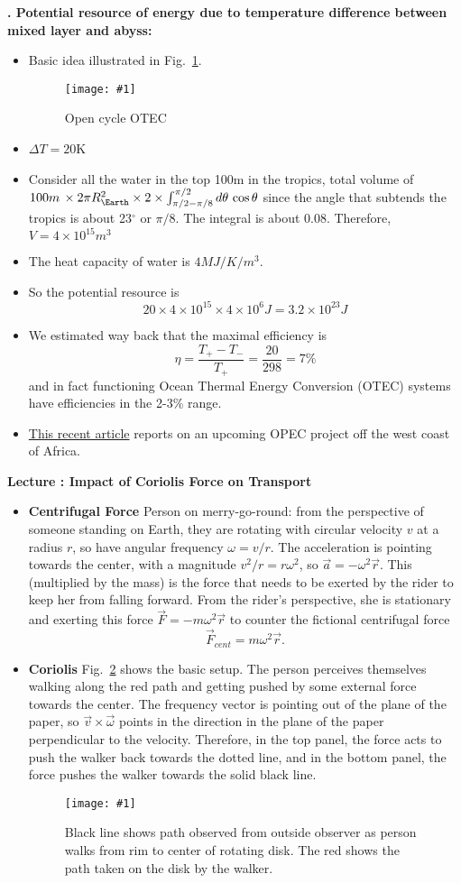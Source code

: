 \documentclass[11pt]{book}
\def\be{\begin{equation}}
\def\ee{\end{equation}}
\newcommand{\sfig}[2]{
\texttt{[image: \#1]}
        }
\newcommand{\Sfig}[2]{
   \begin{figure}[thbp]
   \begin{center}
    \sfig{../Figures/#1.pdf}{0.7\columnwidth}
    \caption{{\small #2}}
    \label{fig:#1}
     \end{center}
   \end{figure}
}
\newcommand{\Spng}[2]{
   \begin{figure}[thbp]
   \begin{center}
    \sfig{../Figures/#1.png}{0.7\columnwidth}
    \caption{{\small #2}}
    \label{fig:#1}
     \end{center}
   \end{figure}
}
\newcommand{\rf}[1]{\ref{fig:#1}}
\newcommand\bei{\begin{itemize}}
\newcommand\eei{\end{itemize}}
\newcommand\lecture[1]{\newpage
\addtocounter{lectureno}{1}
\setcounter{secno}{0}
\begin{center}
 {\bf Lecture \arabic{lectureno}: #1}
\end{center}
}
\newcounter{lectureno}
\newcounter{secno}
\newcommand\lsection[1]{
\addtocounter{secno}{1}
{\bf \arabic{lectureno}.\alph{secno} #1:}}
\begin{document}
\lsection{Potential resource of energy due to temperature difference between mixed layer and abyss}
\bei
\item Basic idea illustrated in Fig.~\rf{otec}.
\Spng{otec}{Open cycle OTEC}
\item $\Delta T=20$K
\item Consider all the water in the top 100m in the tropics, total volume of $100m\,\times 2\pi R_\Earth^2  \times 2\times\int_{\pi/2-\pi/8}^{\pi/2} d\theta\,\cos\theta$ since the angle that subtends the tropics is about 23$^\circ$ or $\pi/8$. The integral is about 0.08. Therefore, $V=4\times 10^{15}m^3$
\item The heat capacity of water is $4 MJ/K/m^3$.
\item So the potential resource is 
\be
20\times 4\times 10^{15}\times 4 \times 10^6J =3.2\times 10^{23} J\ee
\item We estimated way back that the maximal efficiency is 
\be
\eta = \frac{T_+-T_-}{T_+} = \frac{20}{298} = 7\%\ee
and in fact functioning Ocean Thermal Energy Conversion (OTEC) systems have efficiencies in the 2-3\% range.
\item \href{https://www.thecooldown.com/green-tech/dominique-project-sustainable-ocean-thermal-energy-otec/}{This recent article} reports on an upcoming OPEC project off the west coast of Africa.
\eei


\lecture{Impact of Coriolis Force on Transport}

\bei
\item {\bf Centrifugal Force} Person on merry-go-round: from the perspective of someone standing on Earth, they are rotating with circular velocity $v$ at a radius $r$, so have angular frequency $\omega=v/r$. The acceleration is pointing towards the center, with a magnitude $v^2/r=r\omega^2$, so $\vec a = - \omega^2\vec r$. This (multiplied by the mass) is the force that needs to be exerted by the rider to keep her from falling forward. From the rider's perspective, she is stationary and exerting this force $\vec F = -m\omega^2 \vec r$ to counter the fictional centrifugal force
\be
\vec F_{cent} = m\omega^2\vec r.\ee
\item {\bf Coriolis} Fig.~\rf{coriolis} shows the basic setup. The person perceives themselves walking along the red path and getting pushed by some external force towards the center. The frequency vector is pointing out of the plane of the paper, so $\vec v\times\vec\omega$ points in the direction in the plane of the paper perpendicular to the velocity. Therefore, in the top panel, the force acts to push the walker back towards the dotted line, and in the bottom panel, the force pushes the walker towards the solid black line.
\Sfig{coriolis}{Black line shows path observed from outside observer as person walks from rim to center of rotating disk. The red shows the path taken on the disk by the walker.}
\eei
\end{document}
